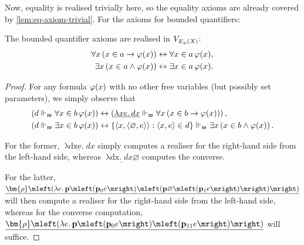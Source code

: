 \documentclass[12pt,openany]{book}
\theoremstyle{plain}
\theoremstyle{definition}
\newcommand\tuple[1]{\left\langle #1 \right\rangle}
\newcommand\opA[1]{\mathop{\forall #1}}
\newcommand\opE[1]{\mathop{\exists #1}}
\newcommand\oplam[1]{\mathop{\lambda #1.}}
\newcommand\bp{\mathbf{p}}
\begin{document}
Now, equality is realised trivially here, so the equality axioms are already covered by \autoref{lem:eq-axiom-trivial}. For the axioms for bounded quantifiers:
\begin{lemma}
  The bounded quantifier axioms are realised in $V_{E_\wp\mleft(X\mright)}$:
  \begin{align*}
    \opA{x} \left(x \in a \rightarrow \varphi\mleft(x\mright)\right) & \leftrightarrow \opA{x \in a} \varphi\mleft(x\mright), \\
    \opE{x} \left(x \in a \land \varphi\mleft(x\mright)\right)       & \leftrightarrow \opE{x \in a} \varphi\mleft(x\mright).
  \end{align*}
\end{lemma}

\begin{proof}
  For any formula $\varphi\mleft(x\mright)$ with no other free variables (but possibly set parameters), we simply observe that
  \begin{align*}
    \left(d \Vdash_\mathfrak{w} \opA{x \in b} \varphi\mleft(x\mright)\right) & \leftrightarrow \left(\underline{\oplam{xe} dx} \Vdash_\mathfrak{w} \opA{x} \left(x \in b \rightarrow \varphi\mleft(x\mright)\right)\right),                          \\
    \left(d \Vdash_\mathfrak{w} \opE{x \in b} \varphi\mleft(x\mright)\right) & \leftrightarrow \left\{\tuple{x, \tuple{\varnothing, e}} : \tuple{x, e} \in d\right\} \Vdash_\mathfrak{w} \opE{x} \left(x \in b \land \varphi\mleft(x\mright)\right).
  \end{align*}

  For the former, $\underline{\oplam{dxe} dx}$ simply computes a realiser for the right-hand side from the left-hand side, whereas $\underline{\oplam{dx} dx \varnothing}$ computes the converse.

  For the latter, $\underline{\bm{\rho} \mleft(\oplam{e} \bp \mleft(\bp_0 e\mright) \mleft(\bp \varnothing \mleft(\bp_1 e\mright)\mright)\mright)}$ will then compute a realiser for the right-hand side from the left-hand side, whereas for the converse computation, $\underline{\bm{\rho} \mleft(\oplam{e} \bp \mleft(\bp_0 e\mright) \mleft(\bp_{11} e\mright)\mright)}$ will suffice.
\end{proof}
\end{document}
